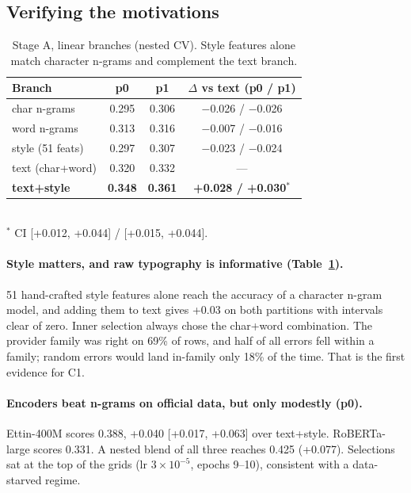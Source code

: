 \documentclass[10pt,twocolumn,letterpaper]{article}
\begin{document}
\subsection{Verifying the motivations}

\begin{table}[t]
\centering\small
\caption{Stage A, linear branches (nested CV). Style features alone match character n-grams and complement the text branch.}
\label{tab:linear}
\begin{tabular}{lccc}
\toprule
Branch & p0 & p1 & $\Delta$ vs text (p0 / p1) \\
\midrule
char n-grams & 0.295 & 0.306 & $-$0.026 / $-$0.026 \\
word n-grams & 0.313 & 0.316 & $-$0.007 / $-$0.016 \\
style (51 feats) & 0.297 & 0.307 & $-$0.023 / $-$0.024 \\
text (char+word) & 0.320 & 0.332 & --- \\
\textbf{text+style} & \textbf{0.348} & \textbf{0.361} & \textbf{+0.028 / +0.030}$^\ast$ \\
\bottomrule
\end{tabular}\\[2pt]
{\footnotesize $^\ast$ CI [+0.012, +0.044] / [+0.015, +0.044].}
\end{table}

\paragraph{Style matters, and raw typography is informative (Table~\ref{tab:linear}).} 51 hand-crafted style features alone reach the accuracy of a character n-gram model, and adding them to text gives +0.03 on both partitions with intervals clear of zero. Inner selection always chose the char+word combination. The provider family was right on 69\% of rows, and half of all errors fell within a family; random errors would land in-family only 18\% of the time. That is the first evidence for C1.

\paragraph{Encoders beat n-grams on official data, but only modestly (p0).} Ettin-400M scores 0.388, +0.040 [+0.017, +0.063] over text+style. RoBERTa-large scores 0.331. A nested blend of all three reaches 0.425 (+0.077). Selections sat at the top of the grids (lr $3\times10^{-5}$, epochs 9--10), consistent with a data-starved regime.
\end{document}
